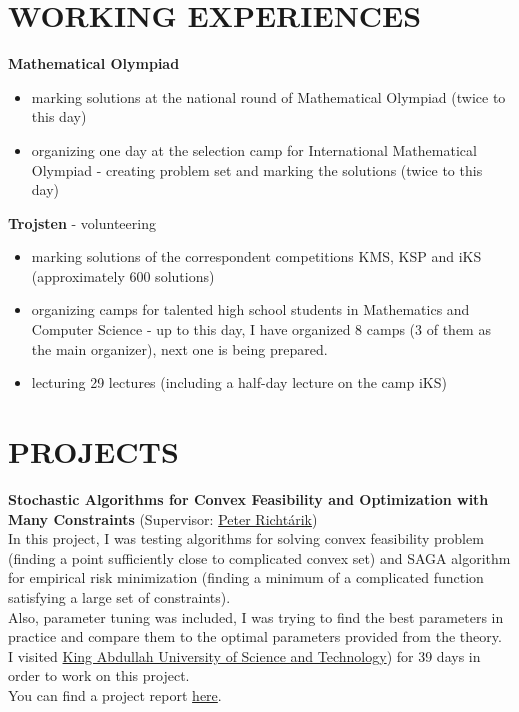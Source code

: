 \documentclass[margin, 10pt]{res} %
\begin{document}
\begin{resume}
		
		
		\section{WORKING EXPERIENCES}
		\textbf{Mathematical Olympiad}
		\begin{itemize}  \itemsep -2pt %
			\item marking solutions at the national round of Mathematical Olympiad (twice to this day)
			\item organizing one day at the selection camp for International Mathematical Olympiad - creating problem set and marking the solutions (twice to this day)
		\end{itemize}
		\textbf{Trojsten} - volunteering
		\begin{itemize} \itemsep -2pt %
			\item marking solutions of the correspondent competitions KMS, KSP and iKS (approximately 600 solutions)
			\item organizing camps for talented high school students in Mathematics and Computer Science - up to this day, I have organized 8 camps (3 of them as the main organizer), next one is being prepared.
			\item lecturing 29 lectures (including a half-day lecture on the camp iKS)
		\end{itemize}
		
		\section{PROJECTS}
		\textbf{Stochastic Algorithms for Convex Feasibility and Optimization with Many Constraints} (Supervisor: \href{https://scholar.google.com/citations?user=pGh242UAAAAJ&hl=en}{
			Peter Richt\'{a}rik})\\
		In this project, I was testing algorithms for solving convex feasibility problem (finding a point sufficiently close to complicated convex set) and SAGA algorithm for empirical risk minimization (finding a minimum of a complicated function satisfying a large set of constraints).\\
		Also, parameter tuning was included, I was trying to find the best parameters in practice and compare them to the optimal parameters provided from the theory.\\
		I visited \href{https://www.kaust.edu.sa/en}{King Abdullah University of Science and Technology}) for 39 days in order to work on this project.\\
		You can find a project report \href{https://github.com/slavoh/rocnikac/blob/master/report_new/report.pdf}{here}.
		

\end{resume}
\end{document}
